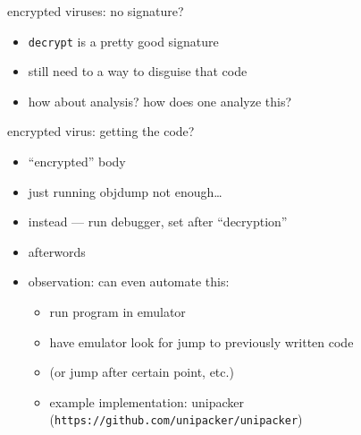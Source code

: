 \begin{frame}{encrypted viruses: no signature?}
    \begin{itemize}
    \item {\tt decrypt} is a pretty good signature
    \item still need to a way to disguise that code
    \vspace{.5cm}
    \item how about analysis? how does one analyze this?
    \end{itemize}
\end{frame}

\begin{frame}{encrypted virus: getting the code?}
    \begin{itemize}
    \item ``encrypted'' body 
    \item just running objdump not enough\ldots
    \item instead --- run debugger, set  after ``decryption''
    \item {} afterwords
    \vspace{.5cm}
    \item observation: can even automate this:
        \begin{itemize}
        \item run program in emulator
        \item have emulator look for jump to previously written code
        \item (or jump after certain point, etc.)
        \item example implementation: unipacker (\texttt{https://github.com/unipacker/unipacker})
        \end{itemize}
    \end{itemize}
\end{frame}

